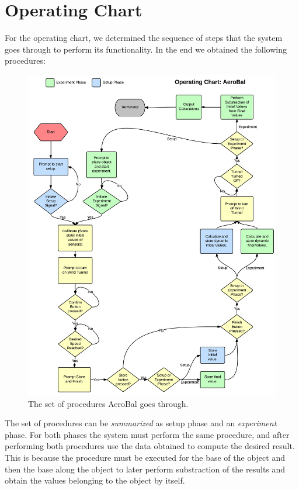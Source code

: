 \section{Operating Chart}
	For the operating chart, we determined the sequence of steps that the system goes through to perform its functionality. In the end we obtained the following procedures:

	\begin{figure}[H]
		\centering
			\includegraphics[scale=0.18]{img/operating-chart-v2}
		\caption{The set of procedures AeroBal goes through.}
	\end{figure}

	The set of procedures can be \emph{summarized} as setup phase and an \emph{experiment} phase. For both phases the system must perform the same procedure, and after performing both procedures use the data obtained to compute the desired result. This is because the procedure must be executed for the base of the object and then the base along the object to later perform substraction of the results and obtain the values belonging to the object by itself.

